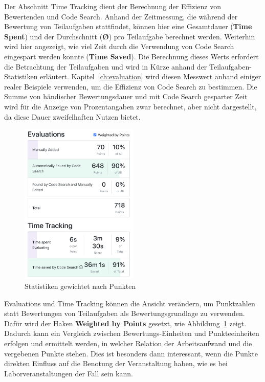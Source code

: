 Der Abschnitt Time Tracking dient der Berechnung der Effizienz von Bewertenden und Code Search.
Anhand der Zeitmessung, die während der Bewertung von Teilaufgaben stattfindet, können hier eine Gesamtdauer (\textbf{Time Spent}) und der Durchschnitt (\textbf{\O}) pro Teilaufgabe berechnet werden.
Weiterhin wird hier angezeigt, wie viel Zeit durch die Verwendung von Code Search eingespart werden konnte (\textbf{Time Saved}).
Die Berechnung dieses Werts erfordert die Betrachtung der Teilaufgaben und wird in Kürze anhand der Teilaufgaben-Statistiken erläutert.
Kapitel~\ref{ch:evaluation} wird diesen Messwert anhand einiger realer Beispiele verwenden, um die Effizienz von Code Search zu bestimmen.
Die Summe von händischer Bewertungsdauer und mit Code Search gesparter Zeit wird für die Anzeige von Prozentangaben zwar berechnet, aber nicht dargestellt, da diese Dauer zweifelhaften Nutzen bietet.

\begin{figure}
    \centering
    \includegraphics[width=0.5\textwidth]{images/assignment-statistics-by-points}
    \caption{Statistiken gewichtet nach Punkten}
    \label{fig:assignment-statistics-by-points}
\end{figure}

Evaluations und Time Tracking können die Ansicht verändern, um Punktzahlen statt Bewertungen von Teilaufgaben als Bewertungsgrundlage zu verwenden.
Dafür wird der Haken \textbf{Weighted by Points} gesetzt, wie Abbildung~\ref{fig:assignment-statistics-by-points} zeigt.
Dadurch kann ein Vergleich zwischen Bewertungs-Einheiten und Punkteeinheiten erfolgen und ermittelt werden, in welcher Relation der Arbeitsaufwand und die vergebenen Punkte stehen.
Dies ist besonders dann interessant, wenn die Punkte direkten Einfluss auf die Benotung der Veranstaltung haben, wie es bei Laborveranstaltungen der Fall sein kann.

